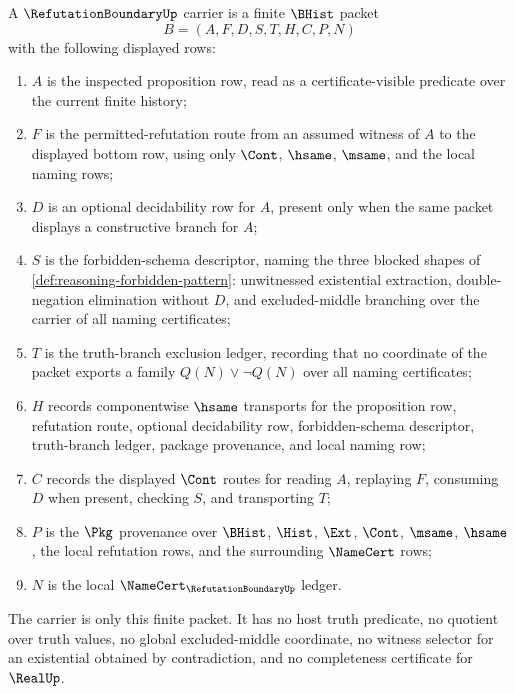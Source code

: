\begin{definition}
\label{def:refutation-boundary-carrier}
A $\RefutationBoundaryUp$ carrier is a finite $\BHist$ packet
$$
B=(A,F,D,S,T,H,C,P,N)
$$
with the following displayed rows:
\begin{enumerate}
\item $A$ is the inspected proposition row, read as a certificate-visible predicate over the current finite history;
\item $F$ is the permitted-refutation route from an assumed witness of $A$ to the displayed bottom row, using only $\Cont$, $\hsame$, $\msame$, and the local naming rows;
\item $D$ is an optional decidability row for $A$, present only when the same packet displays a constructive branch for $A$;
\item $S$ is the forbidden-schema descriptor, naming the three blocked shapes of \autoref{def:reasoning-forbidden-pattern}: unwitnessed existential extraction, double-negation elimination without $D$, and excluded-middle branching over the carrier of all naming certificates;
\item $T$ is the truth-branch exclusion ledger, recording that no coordinate of the packet exports a family $Q(N)\vee\neg Q(N)$ over all naming certificates;
\item $H$ records componentwise $\hsame$ transports for the proposition row, refutation route, optional decidability row, forbidden-schema descriptor, truth-branch ledger, package provenance, and local naming row;
\item $C$ records the displayed $\Cont$ routes for reading $A$, replaying $F$, consuming $D$ when present, checking $S$, and transporting $T$;
\item $P$ is the $\Pkg$ provenance over $\BHist$, $\Hist$, $\Ext$, $\Cont$, $\msame$, $\hsame$, the local refutation rows, and the surrounding $\NameCert$ rows;
\item $N$ is the local $\NameCert_{\RefutationBoundaryUp}$ ledger.
\end{enumerate}
The carrier is only this finite packet. It has no host truth predicate, no quotient over truth values, no global excluded-middle coordinate, no witness selector for an existential obtained by contradiction, and no completeness certificate for $\RealUp$.
\end{definition}


